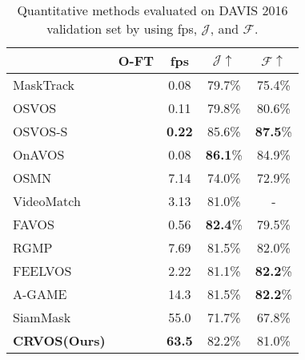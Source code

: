 \documentclass{article}
\begin{document}
\begin{table}[t]
	\centering
	\begin{tabular}{l|c c c c}
											 & O-FT   	  & fps 	      & $\mathcal{J}\uparrow$ & $\mathcal{F}\uparrow$ \\ \midrule
	MaskTrack \cite{perazzi2017learning} 	 & \checkmark & 0.08 		  & 79.7\% 				  & 75.4\%				  \\
	OSVOS \cite{caelles2017one} 			 & \checkmark & 0.11 		  & 79.8\% 				  & 80.6\% 				  \\
	OSVOS-S \cite{maninis2018video} 		 & \checkmark & \textbf{0.22} & 85.6\% 				  & \textbf{87.5}\% 	  \\
	OnAVOS \cite{voigtlaender2017online} 	 & \checkmark & 0.08 		  & \textbf{86.1}\%  	  & 84.9\%				  \\ \midrule
 	OSMN \cite{yang2018efficient} 			 & 			  & 7.14     	  & 74.0\%  			  & 72.9\%				  \\
	VideoMatch \cite{hu2018videomatch}  	 &   		  & 3.13   		  & 81.0\%  			  & -   				  \\
	FAVOS \cite{cheng2018fast} 			     & 			  & 0.56   		  & \textbf{82.4}\% 	  & 79.5\%  			  \\
	RGMP \cite{wug2018fast} 			     &    	      & 7.69   	      & 81.5\%   		      & 82.0\%  			  \\
	FEELVOS \cite{voigtlaender2019feelvos}   &  		  & 2.22 		  & 81.1\%   			  & \textbf{82.2}\%  	  \\
	A-GAME \cite{johnander2019generative}  	 &   		  & 14.3   	      & 81.5\%   	   	   	  & \textbf{82.2}\%  	  \\
	SiamMask \cite{wang2019fast}  	         &   	      & 55.0   	      & 71.7\%     	   	      & 67.8\%    	          \\
	\textbf{CRVOS(Ours)}    	  	   	     &     	      & \textbf{63.5} & 82.2\%     	          & 81.0\%                \\
	\end{tabular}
	\caption{Quantitative methods evaluated on DAVIS 2016 validation set by using fps, $\mathcal{J}$, and $\mathcal{F}$.}
	\label{results table 16}
\end{table}
\end{document}
